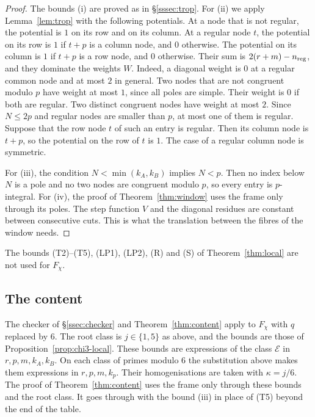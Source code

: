 \begin{proof}
The bounds (i) are proved as in \S\ref{sssec:trop}. For (ii) we apply Lemma~\ref{lem:trop} with the following potentials.
At a node that is not regular, the potential is $1$ on its row and on its column. At a regular node $t$, the potential on
its row is $1$ if $t+p$ is a column node, and $0$ otherwise. The potential on its column is $1$ if $t+p$ is a row node,
and $0$ otherwise. Their sum is $2(r+m)-n_{\rm reg}$, and they dominate the weights $W$. Indeed, a diagonal weight is $0$
at a regular common node and at most $2$ in general. Two nodes that are not congruent modulo $p$ have weight at most $1$,
since all poles are simple. Their weight is $0$ if both are regular. Two distinct congruent nodes have weight at most
$2$. Since $N\le2p$ and regular nodes are smaller than $p$, at most one of them is regular. Suppose that the row node $t$
of such an entry is regular. Then its column node is $t+p$, so the potential on the row of $t$ is $1$. The case of a
regular column node is symmetric.

For (iii), the condition $N<\min(k_A,k_B)$ implies $N<p$. Then no index below $N$ is a pole and no two nodes are
congruent modulo $p$, so every entry is $p$-integral. For (iv), the proof of Theorem~\ref{thm:window} uses the frame only
through its poles. The step function $V$ and the diagonal residues are constant between consecutive cuts. This is what
the translation between the fibres of the window needs.
\end{proof}

The bounds (T2)--(T5), (LP1), (LP2), (R) and (S) of Theorem~\ref{thm:local} are not used for $F_\chi$.

\subsection{The content}
The checker of \S\ref{ssec:checker} and Theorem~\ref{thm:content} apply to $F_\chi$ with $q$ replaced by $6$. The root
class is $j\in\{1,5\}$ as above, and the bounds are those of Proposition~\ref{prop:chi3-local}. These bounds are
expressions of the class $\mathcal E$ in $r,p,m,k_A,k_B$. On each class of primes modulo $6$ the substitution above makes
them expressions in $r,p,m,k_p$. Their homogenisations are taken with $\kappa=j/6$. The proof of
Theorem~\ref{thm:content} uses the frame only through these bounds and the root class. It goes through with the bound
(iii) in place of (T5) beyond the end of the table.

